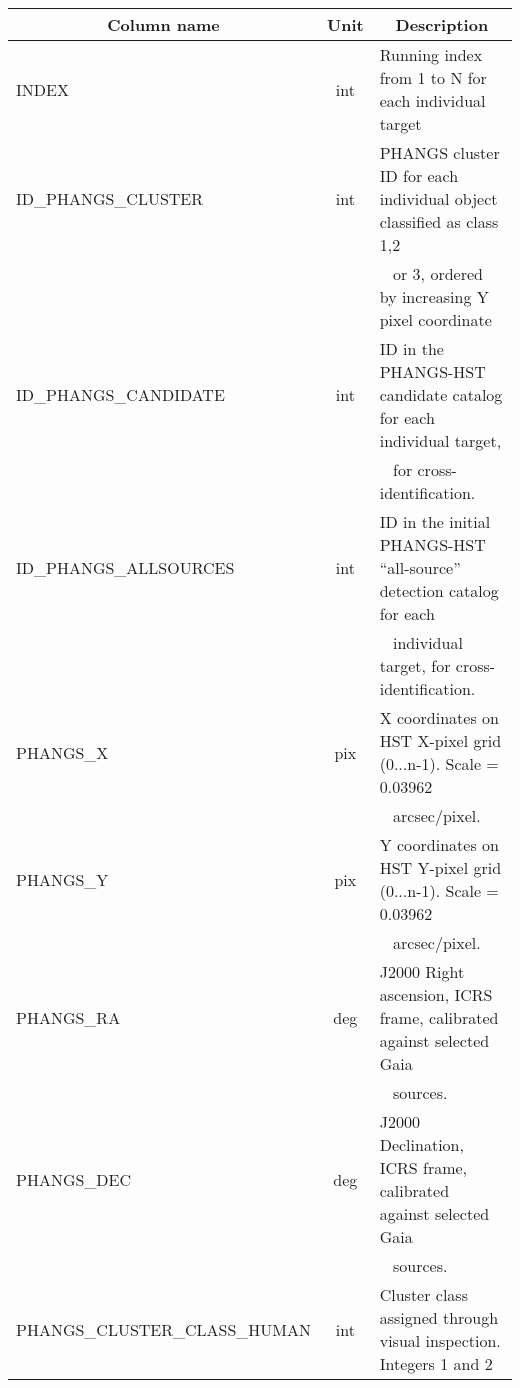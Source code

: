 \documentclass[linenumbers]{aastex63}
\begin{document}
\begin{table*}
\centering
\caption{Content description for the PHANGS-HST DR4/CR2 observed property catalogs of clusters and compact associations.  Source positions were determined in the V-band at the detection stage, generally stemming from the \textsc{DOLPHOT} PSF-fitting photometry measurements and have not been optimized with post-facto centroiding or fitting of extended source models.  This can cause source positions to be shifted slightly ($\sim$~1~pixel) from the true location, but has negligible influence on our photometry due to use of a 4 pixel radius aperture. Upcoming structural fitting of C1+C2 clusters, for the purpose of measuring effective radii, will refine source positions.}
\label{tab:cat_content}
\begin{tabular}{lcl}
\hline\hline
\multicolumn{1}{c}{Column name} & \multicolumn{1}{c}{Unit} & \multicolumn{1}{c}{Description} \\ 
\hline
INDEX & int & Running index from 1 to N for each individual target \\ 
ID\_PHANGS\_CLUSTER & int & PHANGS cluster ID for each individual object classified as class 1,2 \\ 
 &  &  \,\,\, or 3, ordered by increasing Y pixel coordinate \\ 
ID\_PHANGS\_CANDIDATE & int & ID in the PHANGS-HST candidate catalog for each individual target, \\ 
 &  &  \,\,\, for cross-identification. \\ 
ID\_PHANGS\_ALLSOURCES & int & ID in the initial PHANGS-HST “all-source” detection catalog for each \\ 
 &  &  \,\,\, individual target, for cross-identification. \\ 
PHANGS\_X & pix & X coordinates on HST X-pixel grid (0...n-1). Scale = 0.03962 \\ 
 &  &  \,\,\, arcsec/pixel. \\ 
PHANGS\_Y & pix & Y coordinates on HST Y-pixel grid (0...n-1). Scale = 0.03962 \\ 
 &  &  \,\,\, arcsec/pixel. \\ 
PHANGS\_RA & deg & J2000 Right ascension, ICRS frame, calibrated against selected Gaia \\ 
 &  &  \,\,\, sources. \\ 
PHANGS\_DEC & deg & J2000 Declination, ICRS frame, calibrated against selected Gaia \\ 
 &  &  \,\,\, sources. \\ 
PHANGS\_CLUSTER\_CLASS\_HUMAN & int & Cluster class assigned through visual inspection. Integers 1 and 2 \\ 

\end{tabular}
\end{table*}
\end{document}
